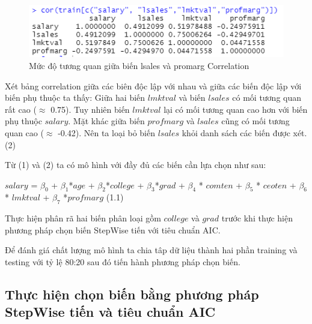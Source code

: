 \begin{figure}[!h]
	\centering
	\includegraphics[scale = 0.6]{../Photo Of Result/B1_CorTable.PNG}  
	\caption{Mức độ tương quan giữa biến lsales và promarg Correlation}
	\label{fig-b1:corr-table}
\end{figure}

Xét bảng correlation giữa các biên độc lập với nhau và giữa các biến độc lập với biến phụ thuộc ta thấy: Giữa hai biến $\textit{lmktval}$ và biến $\textit{lsales}$ có mối tương quan rất cao ($\approx$ 0.75). Tuy nhiên biến $\textit{lmktval}$ lại có mối tương quan cao hơn với biến phụ thuộc $\textit{salary}$. Mặt khác giữa biến $\textit{profmarg}$ và $\textit{lsales}$ cũng có mối tương quan cao ($\approx$ -0.42). Nên ta loại bỏ biến $\textit{lsales}$ khỏi danh sách các biến được xét. (2)

Từ (1) và (2) ta có mô hình với đầy đủ các biến cần lựa chọn như sau:

$\textit{salary}$ = $\beta_0$ + $\beta_1$*$\textit{age}$ + $\beta_2$*$\textit{college}$ + $\beta_3$*$\textit{grad}$ + $\beta_4$ * $\textit{comten}$ + $\beta_5$ * $\textit{ceoten}$ + $\beta_6$ * $\textit{lmktval}$ + $\beta_7$ *$\textit{profmarg}$ (1.1)


Thực hiện phân rã hai biến phân loại gồm $\textit{college}$ và $\textit{grad}$ trước khi thực hiện phương pháp chọn biến StepWise tiến với tiêu chuẩn AIC.

Để đánh giá chất lượng mô hình ta chia tâp dữ liệu thành hai phần training và testing với tỷ lệ 80:20 sau đó tiến hành phương pháp chọn biến.

\subsection*{Thực hiện chọn biến bằng phương pháp StepWise tiến và tiêu chuẩn AIC}

